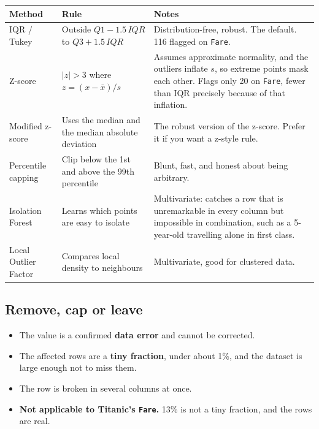 \documentclass[11pt,a4paper]{article}
\begin{document}
\begin{tabularx}{\textwidth}{@{}l X X@{}}
\toprule
\rowcolor{tablehead} \textbf{Method} & \textbf{Rule} & \textbf{Notes} \\
\midrule
IQR / Tukey & Outside $Q1 - 1.5\,IQR$ to $Q3 + 1.5\,IQR$ & Distribution-free, robust. The default. 116 flagged on \texttt{Fare}. \\
Z-score & $|z| > 3$ where $z = (x - \bar{x})/s$ & Assumes approximate normality, and the outliers inflate $s$, so extreme points mask each other. Flags only 20 on \texttt{Fare}, fewer than IQR precisely because of that inflation. \\
Modified z-score & Uses the median and the median absolute deviation & The robust version of the z-score. Prefer it if you want a z-style rule. \\
Percentile capping & Clip below the 1st and above the 99th percentile & Blunt, fast, and honest about being arbitrary. \\
Isolation Forest & Learns which points are easy to isolate & Multivariate: catches a row that is unremarkable in every column but impossible in combination, such as a 5-year-old travelling alone in first class. \\
Local Outlier Factor & Compares local density to neighbours & Multivariate, good for clustered data. \\
\bottomrule
\end{tabularx}


\subsection{Remove, cap or leave}


\begin{itemize}\itemsep2pt
  \item The value is a confirmed \textbf{data error} and cannot be corrected.
  \item The affected rows are a \textbf{tiny fraction}, under about 1\%, and the dataset is
        large enough not to miss them.
  \item The row is broken in several columns at once.
  \item \textbf{Not applicable to Titanic's \texttt{Fare}.} 13\% is not a tiny fraction, and
        the rows are real.
\end{itemize}
\end{document}
